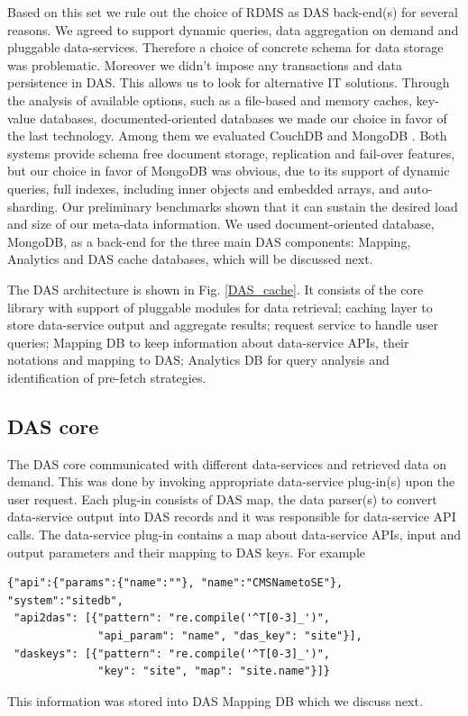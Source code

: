 \documentclass[1p,times]{elsarticle}
\begin{document}
\noindent
Based on this set we rule out the choice of RDMS as DAS back-end(s)
for several reasons. We agreed to support dynamic queries, data
aggregation on demand and pluggable data-services. Therefore a choice 
of concrete schema for data storage was problematic. Moreover we didn't impose
any transactions and data persistence in DAS. This allows us to look 
for alternative IT solutions.
Through the analysis of available options, such as a file-based and memory caches, 
key-value databases, documented-oriented databases we made our choice in favor 
of the last technology. Among them we evaluated CouchDB \cite{CouchDB} and 
MongoDB \cite{MongoDB}. Both systems provide schema free document
storage, replication and fail-over features, but our choice in favor of 
MongoDB was obvious, due to its support of dynamic queries, 
full indexes, including inner objects and embedded arrays,
and auto-sharding. Our preliminary benchmarks shown that it can sustain
the desired load and size of our meta-data information. We used 
document-oriented database, MongoDB, as a back-end for the three 
main DAS components: Mapping, Analytics and DAS cache databases, 
which will be discussed next. 

The DAS architecture is shown in Fig. \ref{DAS_cache}. It consists of
the core library with support of pluggable modules for data retrieval;
caching layer to store data-service output and aggregate results;
request service to handle user queries;
Mapping DB to keep information about data-service APIs, their
notations and mapping to DAS;
Analytics DB for query analysis and identification of pre-fetch 
strategies.

\subsection{DAS core}
The DAS core communicated with different data-services and retrieved
data on demand. This was done by invoking appropriate data-service plug-in(s)
upon the user request. Each plug-in consists of DAS map, the
data parser(s) to convert data-service output into DAS records
and it was responsible for data-service API calls.
The data-service plug-in contains a map about data-service APIs,
input and output parameters and their mapping to DAS keys. For example
\begin{verbatim}
{"api":{"params":{"name":""}, "name":"CMSNametoSE"}, "system":"sitedb",
 "api2das": [{"pattern": "re.compile('^T[0-3]_')", 
              "api_param": "name", "das_key": "site"}], 
 "daskeys": [{"pattern": "re.compile('^T[0-3]_')", 
              "key": "site", "map": "site.name"}]}
\end{verbatim}
This information was stored into DAS Mapping DB which we discuss next.
\end{document}
